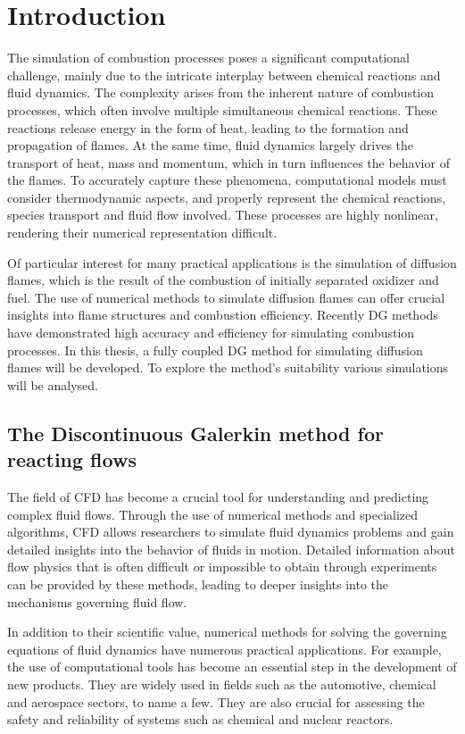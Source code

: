 \chapter{Introduction}	\label{ch:introduction}
The simulation of combustion processes poses a significant computational challenge, mainly due to the intricate interplay between chemical reactions and fluid dynamics. The complexity arises from the inherent nature of combustion processes, which often involve multiple simultaneous chemical reactions. These reactions release energy in the form of heat, leading to the formation and propagation of flames. At the same time, fluid dynamics largely drives the transport of heat, mass and momentum, which in turn influences the behavior of the flames.  To accurately capture these phenomena, computational models must consider thermodynamic aspects, and properly represent the chemical reactions, species transport and fluid flow involved. These processes are highly nonlinear, rendering their numerical representation difficult.

Of particular interest for many practical applications is the simulation of diffusion flames, which is the result of the combustion of initially separated oxidizer and fuel. The use of numerical methods to simulate diffusion flames can offer crucial insights into flame structures and combustion efficiency. Recently \Gls{DG} methods have demonstrated high accuracy and efficiency for simulating combustion processes. In this thesis, a fully coupled \gls{DG} method for simulating diffusion flames will be developed. To explore the method's suitability various simulations will be analysed.

\section{The Discontinuous Galerkin method for reacting flows}
The field of \Gls{CFD} has become a crucial tool for understanding and predicting complex fluid flows. Through the use of numerical methods and specialized algorithms, CFD allows researchers to simulate fluid dynamics problems and gain detailed insights into the behavior of fluids in motion. Detailed information about flow physics that is often difficult or impossible to obtain through experiments can be provided by these methods, leading to deeper insights into the mechanisms governing fluid flow. 

In addition to their scientific value, numerical methods for solving the governing equations of fluid dynamics have numerous practical applications. For example, the use of computational tools has become an essential step in the development of new products. They are widely used in fields such as the automotive, chemical and aerospace sectors, to name a few. They are also crucial for assessing the safety and reliability of systems such as chemical and nuclear reactors.

